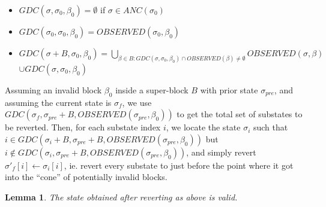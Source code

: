 \documentclass[11pt,a4paper]{report}
\theoremstyle{plain}
\newtheorem{lem}[thm]{Lemma}
\theoremstyle{definition}
\theoremstyle{remark}
\begin{document}
\begin{itemize}
\item
$GDC(\sigma, \sigma_0, \beta_0) = \emptyset$ if $\sigma \in ANC(\sigma_0)$
\item
$GDC(\sigma_0, \sigma_0, \beta_0) = OBSERVED(\sigma_0, \beta_0)$
\item
$GDC(\sigma + B, \sigma_0, \beta_0) = \bigcup_{\beta \in B: GDC(\sigma, \sigma_0, \beta_0) \cap OBSERVED(\beta) \ne \emptyset} OBSERVED(\sigma, \beta)$ $\cup GDC(\sigma, \sigma_0, \beta_0)$
\end{itemize}

Assuming an invalid block $\beta_0$ inside a super-block $B$ with prior state $\sigma_{pre}$, and assuming the current state is $\sigma_f$, we use $GDC(\sigma_f, \sigma_{pre} + B, OBSERVED(\sigma_{pre}, \beta_0))$ to get the total set of substates to be reverted. Then, for each substate index $i$, we locate the state $\sigma_i$ such that $i \in GDC(\sigma_i + B, \sigma_{pre} + B, OBSERVED(\sigma_{pre}, \beta_0))$ but $i \notin GDC(\sigma_i, \sigma_{pre} + B, OBSERVED(\sigma_{pre}, \beta_0))$, and simply revert $\sigma'_f[i] \leftarrow \sigma_i[i]$, ie. revert every substate to just before the point where it got into the ``cone'' of potentially invalid blocks.

\begin{lem}
The state obtained after reverting as above is valid.
\end{lem}
\end{document}
